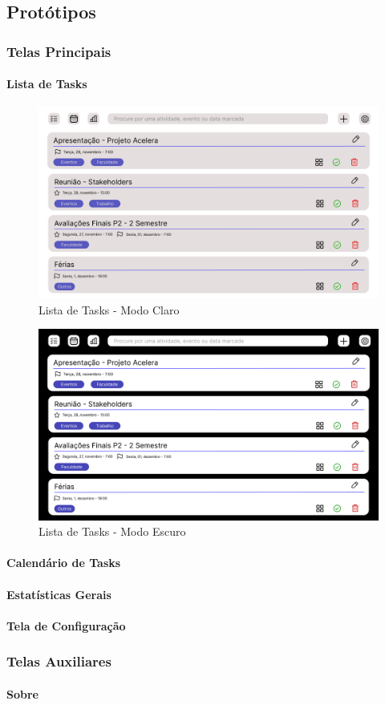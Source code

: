 \documentclass[a4paper,12pt]{article}
\begin{document}
\subsection{Protótipos}
\subsubsection{Telas Principais}
\paragraph{Lista de Tasks}
    \begin{figure}[H]
        \centering
        \includegraphics[scale=0.20]{prototypes/task_list-light.png}
        \caption{Lista de Tasks - Modo Claro}
    \end{figure}

    \begin{figure}[H]
        \centering
        \includegraphics[scale=0.20]{prototypes/task_list-dark.png}
        \caption{Lista de Tasks - Modo Escuro}
    \end{figure}

\paragraph{Calendário de Tasks}
\paragraph{Estatísticas Gerais}
\paragraph{Tela de Configuração}

\subsubsection{Telas Auxiliares}
\paragraph{Sobre}
\end{document}
